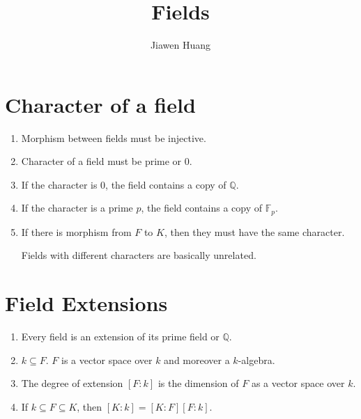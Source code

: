 \documentclass[15pt]{scrartcl}
\newcommand{\Q}{\mathbb{Q}}
\begin{document}
\title{Fields}
\date{}
\author{Jiawen Huang}
\maketitle

\section{Character of a field}
\begin{enumerate}
    \item Morphism between fields must be injective.
    \item Character of a field must be prime or $0$.
    \item If the character is $0$, the field contains a copy of $\Q$.
    \item If the character is a prime $p$, the field contains a copy of $\mathbb{F}_p$. 
    \item If there is morphism from $F$ to $K$, then they must have the same character.
    \begin{remark}
    Fields with different characters are basically unrelated.
    \end{remark}
\end{enumerate}
\section{Field Extensions}
\begin{enumerate}
    \item Every field is an extension of its prime field or $\Q$.
    \item $k\subseteq F$. $F$ is a vector space over $k$ and moreover a $k$-algebra.
    \item The degree of extension $[F:k]$ is the dimension of $F$ as a vector space over $k$.
    \item If $k\subseteq F \subseteq K$, then $[K:k] = [K:F][F:k]$. 
\end{enumerate}
\end{document}
